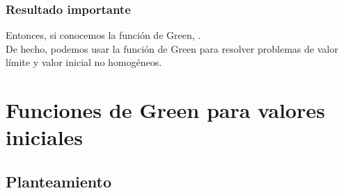 \documentclass[12pt]{beamer}
\begin{document}
\begin{frame}
\frametitle{Resultado importante}
Entonces, si conocemos la función de Green, \pause {}.
\\
\bigskip
\pause
De hecho, podemos usar la función de Green para resolver problemas de valor límite y valor inicial no homogéneos.
\end{frame}

\section{Funciones de Green para valores iniciales}
\subsection{Planteamiento}
\end{document}
